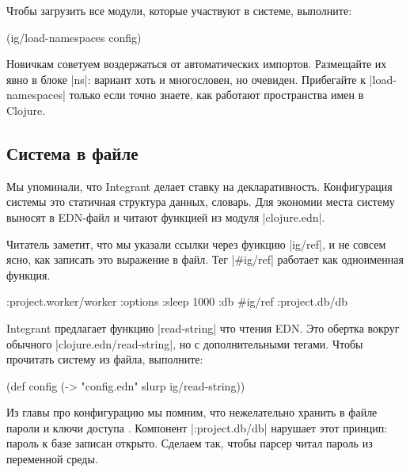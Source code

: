 Чтобы загрузить все модули, которые участвуют в системе, выполните:

\begin{english}
  \begin{clojure}
(ig/load-namespaces config)
  \end{clojure}
\end{english}

Новичкам советуем воздержаться от автоматических импортов. Размещайте их явно в
блоке \spverb|ns|: вариант хоть и многословен, но очевиден. Прибегайте к
\spverb|load-namespaces| только если точно знаете, как работают пространства
имен в Clojure.

\subsection{Система в файле}

Мы упоминали, что Integrant делает ставку на декларативность. Конфигурация
системы это статичная структура данных, словарь. Для экономии места систему
выносят в EDN-файл и читают функцией из модуля \spverb|clojure.edn|.


Читатель заметит, что мы указали ссылки через функцию \spverb|ig/ref|, и не
совсем ясно, как записать это выражение в файл. Тег \spverb|#ig/ref| работает
как одноименная функция.

\begin{english}
  \begin{clojure}
{:project.worker/worker {:options {:sleep 1000}
                         :db #ig/ref :project.db/db}}
  \end{clojure}
\end{english}

Integrant предлагает функцию \spverb|read-string| что чтения EDN. Это обертка
вокруг обычного \spverb|clojure.edn/read-string|, но с дополнительными
тегами. Чтобы прочитать систему из файла, выполните:

\begin{english}
  \begin{clojure}
(def config
  (-> "config.edn" slurp ig/read-string))
  \end{clojure}
\end{english}

Из главы про конфигурацию мы помним, что нежелательно хранить в файле пароли и
ключи доступа . Компонент \spverb|:project.db/db| нарушает
этот принцип: пароль к базе записан открыто. Сделаем так, чтобы парсер читал
пароль из переменной среды.

